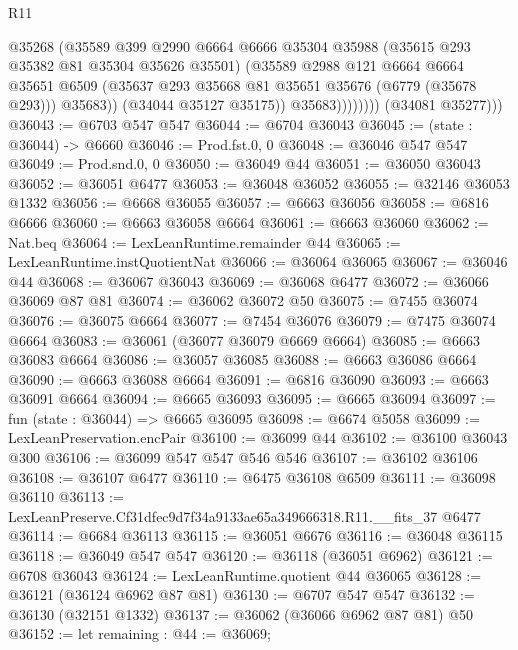 \begin{lexlean}{R11}
\begin{coremodule}
                          @35268
                          (@35589
                            @399
                            @2990
                            @6664
                            @6666
                            @35304
                            @35988
                            (@35615 @293 @35382 @81 @35304 @35626 @35501)
                            (@35589
                              @2988
                              @121
                              @6664
                              @6664
                              @35651
                              @6509
                              (@35637 @293 @35668 @81 @35651 @35676 (@6779 (@35678 @293)))
                              @35683))
                          (@34044 @35127 @35175))
                        @35683))))))))
        (@34081 @35277)))
@36043 := @6703 @547 @547
@36044 := @6704 @36043
@36045 := (state : @36044) -> @6660
@36046 := Prod.fst.{0, 0}
@36048 := @36046 @547 @547
@36049 := Prod.snd.{0, 0}
@36050 := @36049 @44
@36051 := @36050 @36043
@36052 := @36051 @6477
@36053 := @36048 @36052
@36055 := @32146 @36053 @1332
@36056 := @6668 @36055
@36057 := @6663 @36056
@36058 := @6816 @6666
@36060 := @6663 @36058 @6664
@36061 := @6663 @36060
@36062 := Nat.beq
@36064 := LexLeanRuntime.remainder @44
@36065 := LexLeanRuntime.instQuotientNat
@36066 := @36064 @36065
@36067 := @36046 @44
@36068 := @36067 @36043
@36069 := @36068 @6477
@36072 := @36066 @36069 @87 @81
@36074 := @36062 @36072 @50
@36075 := @7455 @36074
@36076 := @36075 @6664
@36077 := @7454 @36076
@36079 := @7475 @36074 @6664
@36083 := @36061 (@36077 @36079 @6669 @6664)
@36085 := @6663 @36083 @6664
@36086 := @36057 @36085
@36088 := @6663 @36086 @6664
@36090 := @6663 @36088 @6664
@36091 := @6816 @36090
@36093 := @6663 @36091 @6664
@36094 := @6665 @36093
@36095 := @6665 @36094
@36097 := fun (state : @36044) => @6665 @36095
@36098 := @6674 @5058
@36099 := LexLeanPreservation.encPair
@36100 := @36099 @44
@36102 := @36100 @36043 @300
@36106 := @36099 @547 @547 @546 @546
@36107 := @36102 @36106
@36108 := @36107 @6477
@36110 := @6475 @36108 @6509
@36111 := @36098 @36110
@36113 := LexLeanPreserve.Cf31dfec9d7f34a9133ae65a349666318.R11.__fits_37 @6477
@36114 := @6684 @36113
@36115 := @36051 @6676
@36116 := @36048 @36115
@36118 := @36049 @547 @547
@36120 := @36118 (@36051 @6962)
@36121 := @6708 @36043
@36124 := LexLeanRuntime.quotient @44 @36065
@36128 := @36121 (@36124 @6962 @87 @81)
@36130 := @6707 @547 @547
@36132 := @36130 (@32151 @1332)
@36137 := @36062 (@36066 @6962 @87 @81) @50
@36152 := let remaining : @44 := @36069;

\end{coremodule}
\end{lexlean}
